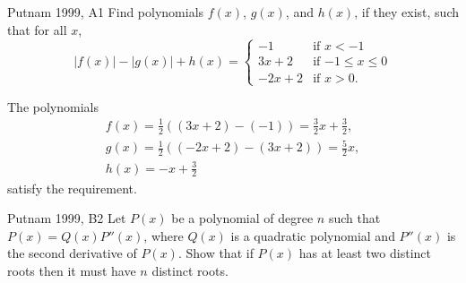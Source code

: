 
\begin{prob}{Putnam 1999, A1}{}
Find polynomials $f(x)$, $g(x)$, and $h(x)$, if they exist, such that for all $x$,
\[
|f(x)|-|g(x)|+h(x) = \begin{cases} -1 & \mbox{if $x<-1$} \\
                     3x+2 & \mbox{if $-1 \leq x \leq 0$} \\
                     -2x+2 & \mbox{if $x>0$.}
                     \end{cases}
\]
\end{prob}

\begin{sol}{}{}
	The polynomials
	\begin{gather*}
		f(x) = \frac{1}{2} ((3x + 2) - (-1)) = \frac{3}{2}x + \frac{3}{2},\\
		g(x) = \frac{1}{2} ((-2x+2) - (3x+2)) = \frac{5}{2}x, \\
		h(x) = -x + \frac{3}{2}
	\end{gather*}
	satisfy the requirement.
\end{sol}

\begin{prob}{Putnam 1999, B2}{}
	Let $P(x)$ be a polynomial of degree $n$ such that $P(x)=Q(x)P''(x)$, where $Q(x)$ is a quadratic polynomial and $P''(x)$ is the second derivative of $P(x)$.
	Show that if $P(x)$ has at least two distinct roots then it must have $n$ distinct roots.	
\end{prob}


